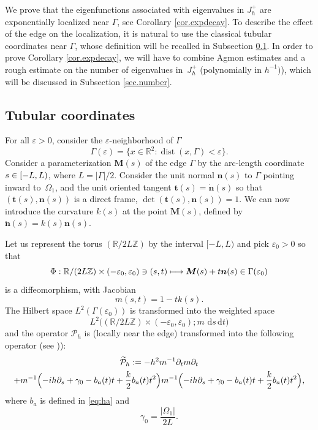 \documentclass[10pt]{amsart}
\newcommand\mto{\mathchoice{\longmapsto}{\mapsto}{\mapsto}{\mapsto}}
\let\sep:
\let\epsilon\varepsilon
\newcommand{\rd}{\,\mathrm{d}}
\DeclareMathOperator{\dist}{dist}
\newcommand{\cP}{\mathcal{P}}
\newcommand{\bn}{\boldsymbol{n}}
\newcommand{\bt}{\boldsymbol{t}}
\newcommand{\bM}{\boldsymbol{M}}
\theoremstyle{plain}
\theoremstyle{definition}
\begin{document}
We prove that the eigenfunctions associated with eigenvalues in $J^+_h$ are exponentially localized near $\Gamma$, see Corollary \ref{cor.expdecay}. To describe the effect of the edge on the localization, it is natural to use the classical tubular coordinates near $\Gamma$, whose definition will be recalled in Subsection \ref{sec.tubular}. In order to prove Corollary \ref{cor.expdecay},
we will have to combine Agmon estimates and a rough estimate on the number of eigenvalues in~$J^+_h$ (polynomially in $h^{-1})$), which will be discussed in Subsection \ref{sec.number}.

\subsection{Tubular coordinates}\label{sec.tubular}
For all $\epsilon>0$, consider the $\epsilon$-neighborhood of $\Gamma$
\begin{equation}\label{eq:gam-ep}
\Gamma(\epsilon)=\{x\in\mathbb R^2\sep \dist(x,\Gamma)<\epsilon\}.
\end{equation}
Consider a parameterization $\bM(s)$ of the edge $\Gamma$ by the arc-length coordinate $s\in\nobreak[-L,L)$, where $L=|\Gamma|/2$. Consider the unit normal $\bn(s)$ to $\Gamma$ pointing inward to~$\Omega_1$, and the unit oriented tangent $\bt(s)=\dot{\bn}(s)$ so that $(\bt(s),\bn(s))$ is a direct frame, \ie $\det(\bt(s),\bn(s))=1$. We can now introduce the curvature $k(s)$ at the point $\bM(s)$, defined by $\ddot{\bn}(s)=k(s)\bn(s)$.

Let us represent the torus $(\mathbb R/ 2L \mathbb Z)$ by the interval $[-L,L)$ and pick $\epsilon_0>0$ so that
\[
\Phi: \mathbb R/ (2L \mathbb Z)\times (-\epsilon_0,\epsilon_0)\ni (s,t)\mto \bM(s)+t\bn(s)\in\Gamma(\epsilon_0)
\]
is a diffeomorphism, with Jacobian
\begin{equation}\label{defm}m(s,t)=1-tk(s).
\end{equation}
The Hilbert space $L^2(\Gamma(\epsilon_0))$ is transformed into the weighted space
\[
L^2\bigl((\mathbb R/ 2L \mathbb Z) \times(-\epsilon_0,\epsilon_0);m\,\rd s\rd t\bigr)
\] and the operator $\cP_h$ is (locally near the edge) transformed into the following operator (see \cite[App.\,F]{FH10})):
\begin{multline*}
\widetilde{\cP}_h:=-h^2m^{-1}\partial_t m\partial_t\\+m^{-1}\Bigl(-ih\partial_s+\gamma_0-b_a(t)t+\frac{k}{2}b_a(t)t^2\Bigr)m^{-1}\Bigl(-ih\partial_s+\gamma_0-b_a(t)t+\frac{k}{2}b_a(t)t^2\Bigr),
\end{multline*}
where $b_a$ is defined in \eqref{eq:ha} and
\begin{equation}\label{eq:circ}
\gamma_0=\frac{|\Omega_1|}{2L}.
\end{equation}
\end{document}
